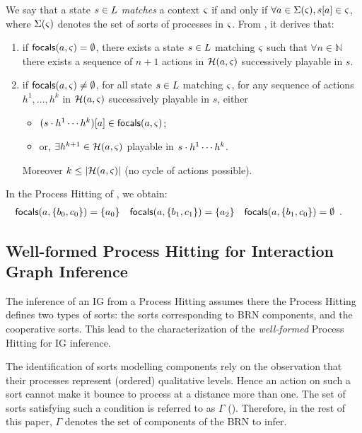 We say that a state $s\in L$ \emph{matches} a context $\varsigma$ if and only if
$\forall a\in\Sigma(\varsigma), {s[a]}\in\varsigma$, where $\Sigma(\varsigma)$ denotes the set of sorts of
processes in $\varsigma$.
From , it derives that:
\begin{enumerate}
\item if $\mathsf{focals}(a,\varsigma)=\emptyset$, there exists a 
state $s\in L$ matching $\varsigma$ such that $\forall n\in\mathbb N$ there 
exists a sequence of $n+1$ actions in $\mathcal{H}(a,\varsigma)$ successively playable in $s$.
\item if $\mathsf{focals}(a,\varsigma)\neq\emptyset$, for all
state $s\in L$ matching $\varsigma$,
for any sequence of actions $h^1,\dots,h^k$ in $\mathcal{H}(a,\varsigma)$ successively playable in $s$,
either
\begin{itemize}
\item $(s\cdot h^1\cdots h^k)[a] \in \mathsf{focals}(a,\varsigma)$;
\item or, $\exists h^{k+1}\in \mathcal{H}(a,\varsigma)$ playable in $s\cdot h^1\cdots h^k$.
\end{itemize}
Moreover $k\leq|\mathcal{H}(a,\varsigma)|$ (no cycle of actions possible).
\end{enumerate}

\begin{example*}
In the Process Hitting of , we obtain:
\begin{align*}
\mathsf{focals}(a,\{b_0,c_0\}) &= \{ a_0 \}
&
\mathsf{focals}(a,\{b_1,c_1\}) &= \{ a_2 \}
&
\mathsf{focals}(a,\{b_1,c_0\}) &= \emptyset\enspace.
\end{align*}
\end{example*}

\subsection{Well-formed Process Hitting for Interaction Graph Inference}

The inference of an IG from a Process Hitting assumes there the Process Hitting defines two types of
sorts:
the sorts corresponding to BRN components, and the cooperative sorts.
This lead to the characterization of the \emph{well-formed} Process Hitting for IG inference.

The identification of sorts modelling components rely on the observation that their processes
represent (ordered) qualitative levels.
Hence an action on such a sort cannot make it bounce to process at a distance more than one.
The set of sorts satisfying such a condition is referred to as $\Gamma$
().
Therefore, in the rest of this paper, $\Gamma$ denotes the set of components of the BRN to infer.

